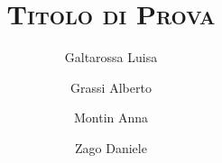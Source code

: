 \documentclass{beamer}
\title{\textsc{Titolo di Prova}}
\author{Galtarossa Luisa\and Grassi Alberto\and Montin Anna\and Zago Daniele}
\date{}
\begin{document}
\begin{frame}
\titlepage
\end{frame}


%
%

\end{document}
